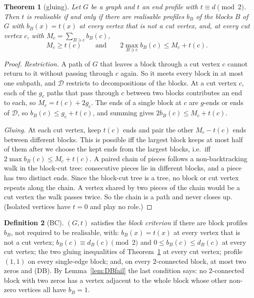 \documentclass[11pt]{amsart}
\newtheorem{theorem}{Theorem}[section]
\theoremstyle{definition}
\newtheorem{definition}[theorem]{Definition}
\begin{document}
\begin{theorem}[gluing]\label{thm:glue}
Let $G$ be a graph and $t$ an end profile with $t\equiv d\pmod 2$. Then $t$ is realisable if and only if
there are realisable profiles $b_B$ of the blocks $B$ of $G$ with $b_B(x)=t(x)$ at every vertex that is not
a cut vertex, and, at every cut vertex $c$, with $M_c=\sum_{B\ni c}b_B(c)$,
\[
M_c\ge t(c)\qquad\text{and}\qquad 2\max_{B\ni c}b_B(c)\le M_c+t(c).
\]
\end{theorem}
\begin{proof}
\emph{Restriction.} A path of $G$ that leaves a block through a cut vertex $c$ cannot return to it without
passing through $c$ again. So it meets every block in at most one subpath, and $\mathcal D$ restricts to
decompositions of the blocks. At a cut vertex $c$, each of the $g_c$ paths that pass through $c$ between
two blocks contributes an end to each, so $M_c=t(c)+2g_c$. The ends of a single block at $c$ are
$g$-ends or ends of $\mathcal D$, so $b_B(c)\le g_c+t(c)$, and summing gives $2b_B(c)\le M_c+t(c)$.

\emph{Gluing.} At each cut vertex, keep $t(c)$ ends and pair the other $M_c-t(c)$ ends between different
blocks. This is possible iff the largest block keeps at most half of them after we choose the kept ends
from the largest blocks, i.e.\ iff $2\max b_B(c)\le M_c+t(c)$. A paired chain of pieces follows a
non-backtracking walk in the block-cut tree: consecutive pieces lie in different blocks, and a piece has
two distinct ends. Since the block-cut tree is a tree, no block or cut vertex repeats along the chain. A
vertex shared by two pieces of the chain would be a cut vertex the walk passes twice. So the chain is a
path and never closes up. (Isolated vertices have $t=0$ and play no role.)
\end{proof}

\begin{definition}[BC]\label{def:BC}
$(G,t)$ satisfies the \emph{block criterion} if there are block profiles $b_B$, not required to be
realisable, with: $b_B(x)=t(x)$ at every vertex that is not a cut vertex; $b_B(c)\equiv d_B(c)\pmod 2$ and
$0\le b_B(c)\le d_B(c)$ at every cut vertex; the two gluing inequalities of Theorem~\ref{thm:glue} at every
cut vertex; profile $(1,1)$ on every single-edge block; and, on every $2$-connected block, at most two
zeros and (DB). By Lemma~\ref{lem:DBfail} the last condition says: no $2$-connected block with two zeros has
a vertex adjacent to the whole block whose other non-zero vertices all have $b_B=1$.
\end{definition}
\end{document}
